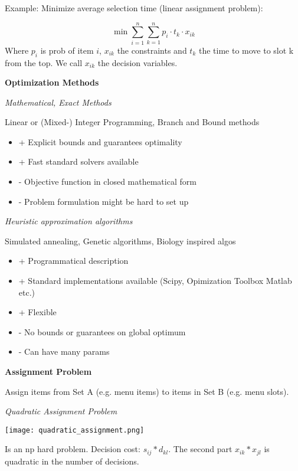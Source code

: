 Example: Minimize average selection time (linear assignment problem):

$$\min \sum_{i=1}^{n} \sum_{k=1}^{n} p_{i} \cdot t_{k} \cdot x_{ik}$$
Where $p_i$ is prob of item $i$, $x_{ik}$ the constraints and $t_k$ the time to move to slot k from the top. We call $x_{ik}$ the decision variables. 

\textbf{Optimization Methods}

\textit{Mathematical, Exact Methods} \smallskip

Linear or (Mixed-) Integer Programming, Branch and Bound methods

\begin{itemize}[itemsep=-5pt, topsep=0pt, leftmargin=*]
	\item + Explicit bounds and guarantees optimality
	\item + Fast standard solvers available
	\item - Objective function in closed mathematical form
	\item - Problem formulation might be hard to set up
\end{itemize}


\textit{Heuristic approximation algorithms} \smallskip

Simulated annealing, Genetic algorithms, Biology inspired algos

\begin{itemize}[itemsep=-5pt, topsep=0pt, leftmargin=*]
	\item + Programmatical description
	\item + Standard implementations available (Scipy, Opimization Toolbox Matlab etc.)
	\item + Flexible
	\item - No bounds or guarantees on global optimum
	\item - Can have many params
\end{itemize}


\textbf{Assignment Problem} \medskip

Assign items from Set A (e.g. menu items) to items in Set B (e.g. menu slots). \smallskip

\textit{Quadratic Assignment Problem}

\begin{center}
	\texttt{[image: quadratic\_assignment.png]}
\end{center}

Is an np hard problem. Decision cost: $s_{ij} * d_{kl}$. The second part  $x_{ik} * x_{jl}$ is quadratic in the number of decisions. \medskip


